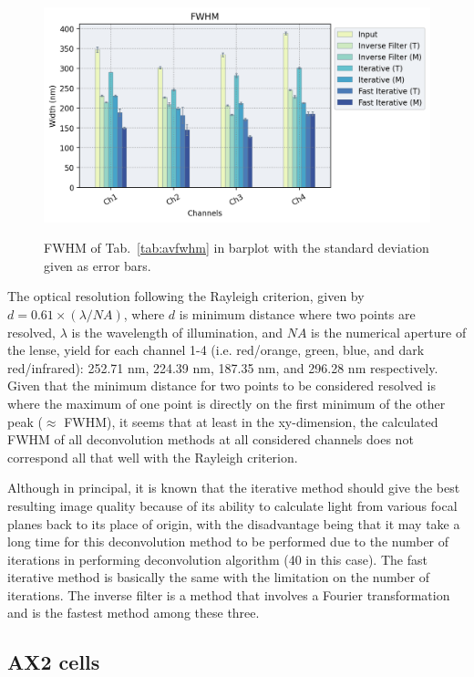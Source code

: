 \begin{figure}[h!]
\centering
\includegraphics[width=.9\columnwidth]{Exp_7_Deconvolution/Figures/av_tabnmerr7}\\
\caption{FWHM of Tab.~\ref{tab:avfwhm} in barplot with the standard deviation given as error bars.}
\label{fig:avfwhmbar}
\end{figure}

The optical resolution following the Rayleigh criterion, given by $d=0.61\times(\lambda/NA)$, where $d$ is minimum distance where two points are resolved, $\lambda$ is the wavelength of illumination, and $NA$ is the numerical aperture of the lense, yield for each channel 1-4 (i.e. red/orange, green, blue, and dark red/infrared): 252.71 nm, 224.39 nm, 187.35 nm, and 296.28 nm respectively. 
Given that the minimum distance for two points to be considered resolved is where the maximum of one point is directly on the first minimum of the other peak ($\approx$ FWHM), it seems that at least in the xy-dimension, the calculated FWHM of all deconvolution methods at all considered channels does not correspond all that well with the Rayleigh criterion.
 
Although in principal, it is known that the iterative method should give the best resulting image quality because of its ability to calculate light from various focal planes back to its place of origin, with the disadvantage being that it may take a long time for this deconvolution method to be performed due to the number of iterations in performing deconvolution algorithm (40 in this case). 
The fast iterative method is basically the same with the limitation on the number of iterations. 
The inverse filter is a method that involves a Fourier transformation and is the fastest method among these three.


\subsection{AX2 cells}

